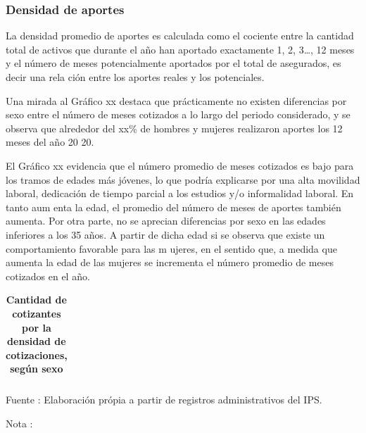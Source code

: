 \subsubsection{Densidad de aportes}

La densidad promedio de aportes es calculada como el cociente entre la
cantidad total de activos que durante el año han aportado exactamente 1,
2, 3\ldots{}, 12 meses y el número de meses potencialmente aportados por
el total de asegurados, es decir una rela ción entre los aportes reales
y los potenciales.

Una mirada al Gráfico xx destaca que prácticamente no existen
diferencias por sexo entre el número de meses cotizados a lo largo del
periodo considerado, y se observa que alrededor del xx\% de hombres y
mujeres realizaron aportes los 12 meses del año 20 20.

El Gráfico xx evidencia que el número promedio de meses cotizados es
bajo para los tramos de edades más jóvenes, lo que podría explicarse por
una alta movilidad laboral, dedicación de tiempo parcial a los estudios
y/o informalidad laboral. En tanto aum enta la edad, el promedio del
número de meses de aportes también aumenta. Por otra parte, no se
aprecian diferencias por sexo en las edades inferiores a los 35 años. A
partir de dicha edad si se observa que existe un comportamiento
favorable para las m ujeres, en el sentido que, a medida que aumenta la
edad de las mujeres se incrementa el número promedio de meses cotizados
en el año.

\begin{table}[H]
\begin{center}
\footnotesize
\caption{\bf{Cantidad de cotizantes por la densidad de cotizaciones, según sexo}}
\begin{tabular}{l|rrrrrrrrrrr}

\end{tabular}
                    \item \footnotesize Fuente : Elaboración própia a partir de registros administrativos del IPS.
                    \item \footnotesize Nota : 
\end{center}
\end{table}

